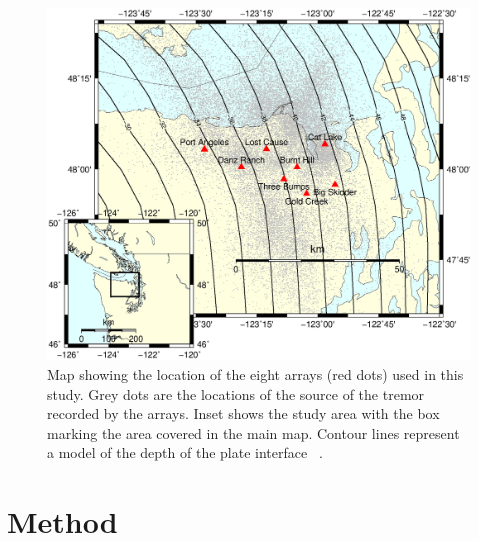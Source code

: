 \documentclass[draft]{agujournal2019}
\begin{document}
\begin{figure}
\noindent\includegraphics[width=\textwidth, trim={0cm 2.5cm 0cm 9.5cm},clip]{figures/arrays_location.eps}
\caption{Map showing the location of the eight arrays (red dots) used in this study. Grey dots are the locations of the source of the tremor recorded by the arrays. Inset shows the study area with the box marking the area covered in the main map. Contour lines represent a model of the depth of the plate interface ~\cite{MCC_2006}.}
\label{pngfiguresample}
\end{figure}

\section{Method}
\end{document}
